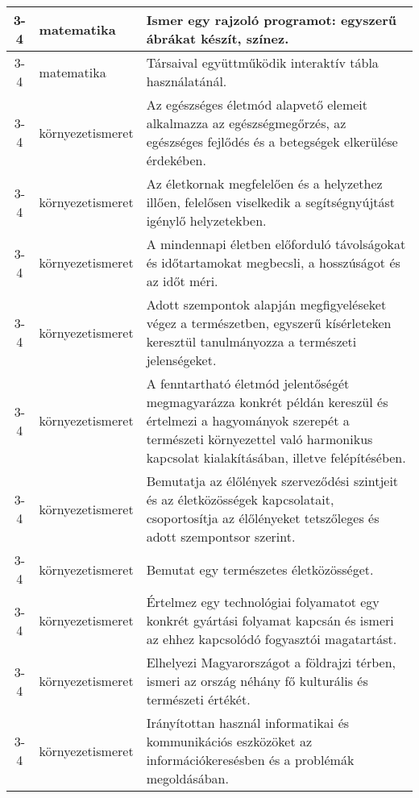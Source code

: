 \begin{small}
\begin{longtable}{c | p{2cm} |  p{11cm} }
              3-4 & matematika & Ismer egy rajzoló programot: egyszerű ábrákat készít, színez.
 \\ \hline
              3-4 & matematika & Társaival együttműködik interaktív tábla használatánál. \\ \hline
              3-4 & környezetismeret & Az egészséges életmód alapvető elemeit alkalmazza az egészségmegőrzés, az egészséges fejlődés és a betegségek elkerülése érdekében. \\ \hline
              3-4 & környezetismeret & Az életkornak megfelelően és a helyzethez illően, felelősen viselkedik a segítségnyújtást igénylő helyzetekben. \\ \hline
              3-4 & környezetismeret & A mindennapi életben előforduló távolságokat és időtartamokat megbecsli, a hosszúságot és az időt méri. \\ \hline
              3-4 & környezetismeret & Adott szempontok alapján megfigyeléseket végez a természetben, egyszerű kísérleteken keresztül tanulmányozza a természeti jelenségeket. \\ \hline
              3-4 & környezetismeret & A fenntartható életmód jelentőségét megmagyarázza konkrét példán kereszül és értelmezi a hagyományok szerepét a természeti környezettel való harmonikus kapcsolat kialakításában, illetve felépítésében. \\ \hline
              3-4 & környezetismeret & Bemutatja az élőlények szerveződési szintjeit és az életközösségek kapcsolatait, csoportosítja az élőlényeket tetszőleges és adott szempontsor szerint. \\ \hline
              3-4 & környezetismeret & Bemutat egy természetes életközösséget. \\ \hline
              3-4 & környezetismeret & Értelmez egy technológiai folyamatot egy konkrét gyártási folyamat kapcsán és ismeri az ehhez kapcsolódó fogyasztói magatartást. \\ \hline
              3-4 & környezetismeret & Elhelyezi Magyarországot a földrajzi térben, ismeri az ország néhány fő kulturális és természeti értékét. \\ \hline
              3-4 & környezetismeret & Irányítottan használ informatikai és kommunikációs eszközöket az információkeresésben és a problémák megoldásában. \\ \hline
      \end{longtable}
\end{small}


